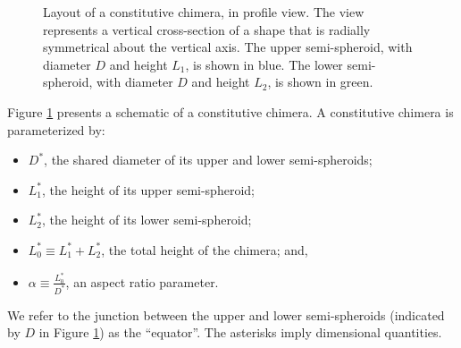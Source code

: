 \documentclass[10pt,a4paper]{article}
\begin{document}
\begin{figure}[t] 
	\begin{center}
	\end{center}
	\caption{Layout of a constitutive chimera, in profile view. The view represents a vertical cross-section of a shape that is radially symmetrical about the vertical axis. The upper semi-spheroid, with diameter $D$ and height $L_1$, is shown in blue. The lower semi-spheroid, with diameter $D$ and height $L_2$, is shown in green. } \label{chimera1}
\end{figure}
\noindent
Figure \ref{chimera1} presents a schematic of a constitutive chimera.
A constitutive chimera is parameterized by:
\begin{itemize}
	\item $D^*$, the shared diameter of its upper and lower semi-spheroids;
	\item $L_1^*$, the height of its upper semi-spheroid;
	\item $L_2^*$, the height of its  lower semi-spheroid; 
	\item $L_0^* \equiv L_1^* + L_2^*$, the total height of the chimera; and,
	\item $\alpha \equiv \frac{L_0^*}{D^*}$, an aspect ratio parameter.
\end{itemize}
We refer to the junction between the upper and lower semi-spheroids (indicated by $D$ in Figure \ref{chimera1}) as the ``equator''.
The asterisks imply dimensional quantities.
\end{document}
